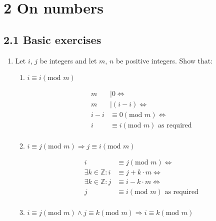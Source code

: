\documentclass[10pt,\jkfside,a4paper]{article}
\begin{document}
\section*{2 On numbers}

\subsection*{2.1 Basic exercises}

\begin{enumerate}

\item Let $i$, $j$ be integers and let $m$, $n$ be positive integers. Show that:

\begin{enumerate}

\item $i \equiv i (\text{mod } m)$

\begin{equation}\label{211a}
\begin{split}
m&|0\Longleftrightarrow\\
m&|(i - i)\Longleftrightarrow\\
i - i &\equiv 0(\text{mod } m)\Longleftrightarrow\\
i &\equiv i(\text{mod } m)\text{ as required}\\
\end{split}
\end{equation}

\item $i \equiv j (\text{mod } m) \Longrightarrow j \equiv i (\text{mod } m)$

\begin{equation}\label{211b}
\begin{split}
i &\equiv j (\text{mod } m) \Longleftrightarrow\\
\exists k \in \mathbb{Z}: i &\equiv j + k\cdot m \Longleftrightarrow\\
\exists k \in \mathbb{Z}: j &\equiv i - k\cdot m \Longleftrightarrow\\
j &\equiv i(\text{mod } m)\text{ as required}\\
\end{split}
\end{equation}

\item $i \equiv j (\text{mod } m) \wedge j \equiv k (\text{mod } m) \Longrightarrow i \equiv k (\text{mod } m)$


\end{enumerate}
\end{enumerate}
\end{document}
